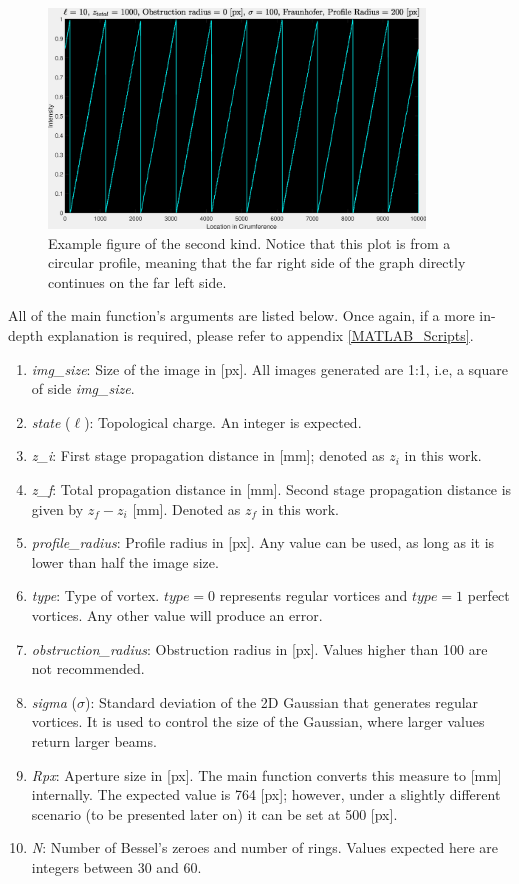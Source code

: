 \begin{figure}[htbp]
    \centering
    \includegraphics[width=10cm]{images/c03/TC_example.eps}
    \caption{Example figure of the second kind. Notice that this plot is from a circular profile, meaning that the far right side of the graph directly continues on the far left side.}
    \label{fig:example_figure2}
\end{figure}

\newpage
All of the main function's arguments are listed below. Once again, if a more in-depth explanation is required, please refer to appendix \ref{MATLAB_Scripts}.

\begin{enumerate}
    \item \textit{img\_size}: Size of the image in [px]. All images generated are 1:1, i.e, a square of side \textit{img\_size}.
    \item \textit{state} ($\ell$): Topological charge. An integer is expected.
    \item \textit{z\_i}: First stage propagation distance in [mm]; denoted as $z_i$ in this work.
    \item \textit{z\_f}: Total propagation distance in [mm]. Second stage propagation distance is given by $z_f - z_i$ [mm]. Denoted as $z_f$ in this work.
    \item \textit{profile\_radius}: Profile radius in [px]. Any value can be used, as long as it is lower than half the image size.
    \item \textit{type}: Type of vortex. $type = 0$ represents regular vortices and $type = 1$ perfect vortices. Any other value will produce an error.
    \item \textit{obstruction\_radius}: Obstruction radius in [px]. Values higher than 100 are not recommended.
    \item \textit{sigma} ($\sigma$): Standard deviation of the 2D Gaussian that generates regular vortices. It is used to control the size of the Gaussian, where larger values return larger beams.
    \item \textit{Rpx}: Aperture size in [px]. The main function converts this measure to [mm] internally. The expected value is 764 [px]; however, under a slightly different scenario (to be presented later on) it can be set at 500 [px].
    \item \textit{N}: Number of Bessel's zeroes\footnotemark{} and number of rings. Values expected here are integers between 30 and 60.
\end{enumerate}

